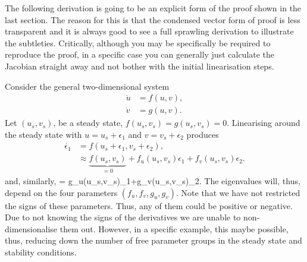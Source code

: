 The following derivation is going to be an explicit form of the proof shown in the last section. The reason for this is that the condensed vector form of proof is less transparent and it is always good to see a full sprawling derivation to illustrate the subtleties. Critically, although you may be specifically be required to reproduce the proof, in a specific case you can generally just calculate the Jacobian straight away and not bother with the initial linearisation steps.

Consider the general two-dimensional system
\begin{align}
\dot{u}&=f(u,v),\\
\dot{v}&=g(u,v).
\end{align}
Let $(u_s,v_s)$, be a steady state, \ie $f(u_s,v_s)=g(u_s,v_s)=0$. Linearising around the steady state with $u=u_s+\epsilon_1$ and $v=v_s+\epsilon_2$ produces
\begin{align}
\dot{\epsilon_1}&= f(u_s+\epsilon_1,v_s+\epsilon_2),\nonumber\\
&\approx \underbrace{f(u_s,v_s)}_{=0}+f_u(u_s,v_s)\epsilon_1+f_v(u_s,v_s)\epsilon_2.\label{Two_d_f}
\end{align}
and, similarly,
\bb
{}= g_u(u_s,v_s)\epsilon_1+g_v(u_s,v_s)\epsilon_2.\label{Two_d_g}
\ee
The eigenvalues will, thus, depend on the four parameters $(f_u,f_v,g_u,g_v)$. Note that we have not restricted the signs of these parameters. Thus, any of them could be positive or negative. Due to not knowing the signs of the derivatives we are unable to non-dimensionalise them out. However, in a specific example, this maybe possible, thus, reducing down the number of free parameter groups in the steady state and stability conditions.

